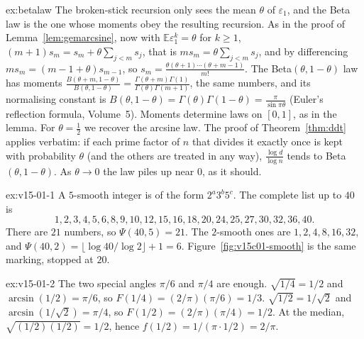\begin{solution}{ex:betalaw}
\idea The broken-stick recursion only sees the mean $\theta$ of $\varepsilon_1$, and the Beta law is the one whose moments obey the resulting recursion.
\writeup As in the proof of Lemma~\ref{lem:gemarcsine}, now with $\mathbb E\varepsilon_1^k=\theta$ for $k\ge1$, $(m+1)s_m=s_m+\theta\sum_{j<m}s_j$, that is $ms_m=\theta\sum_{j<m}s_j$, and by differencing $ms_m=(m-1+\theta)s_{m-1}$, so $s_m=\frac{\theta(\theta+1)\cdots(\theta+m-1)}{m!}$. The Beta$(\theta,1-\theta)$ law has moments $\frac{B(\theta+m,1-\theta)}{B(\theta,1-\theta)}=\frac{\Gamma(\theta+m)\Gamma(1)}{\Gamma(\theta)\Gamma(m+1)}$, the same numbers, and its normalising constant is $B(\theta,1-\theta)=\Gamma(\theta)\Gamma(1-\theta)=\frac\pi{\sin\pi\theta}$ (Euler's reflection formula, Volume~5). Moments determine laws on $[0,1]$, as in the lemma. For $\theta=\frac12$ we recover the arcsine law. The proof of Theorem~\ref{thm:ddt} applies verbatim: if each prime factor of $n$ that divides it exactly once is kept with probability $\theta$ (and the others are treated in any way), $\frac{\log d}{\log n}$ tends to Beta$(\theta,1-\theta)$. As $\theta\to0$ the law piles up near $0$, as it should.
\end{solution}

\begin{solution}{ex:v15-01-1}
\idea A \(5\)-smooth integer is of the form \(2^a3^b5^c\).
\writeup The complete list up to \(40\) is
\[
1,2,3,4,5,6,8,9,10,12,15,16,18,20,24,25,27,30,32,36,40.
\]
There are \(21\) numbers, so \(\Psi(40,5)=21\). The \(2\)-smooth ones are \(1,2,4,8,16,32\), and \(\Psi(40,2)=\lfloor\log40/\log2\rfloor+1=6\). Figure~\ref{fig:v15c01-smooth} is the same marking, stopped at \(20\).
\end{solution}

\begin{solution}{ex:v15-01-2}
\idea The two special angles \(\pi/6\) and \(\pi/4\) are enough.
\writeup \(\sqrt{1/4}=1/2\) and \(\arcsin(1/2)=\pi/6\), so \(F(1/4)=(2/\pi)(\pi/6)=1/3\). \(\sqrt{1/2}=1/\sqrt2\) and \(\arcsin(1/\sqrt2)=\pi/4\), so \(F(1/2)=(2/\pi)(\pi/4)=1/2\). At the median, \(\sqrt{(1/2)(1/2)}=1/2\), hence \(f(1/2)=1/(\pi\cdot1/2)=2/\pi\).
\end{solution}

